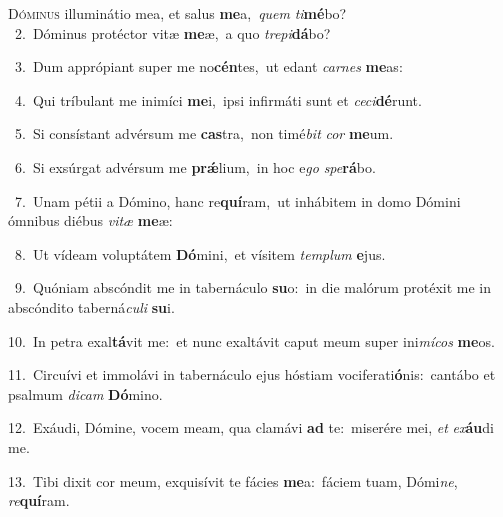\lettrine{\initial\textcolor{\initialcolor}{D}}{óminus} illuminátio mea, et salus \textbf{me}\-a,~\star \textit{quem} \textit{ti}\-\textbf{mé}bo?\\
{\numbfont\textcolor{\numbcolor}{~2.}}~Dóminus protéctor vitæ \textbf{me}\-æ,~\star a quo \textit{tre}\-\textit{pi}\textbf{dá}bo?\par
{\numbfont\textcolor{\numbcolor}{~3.}}~Dum apprópiant super me no\-\textbf{cén}\-tes,~\star ut edant \textit{car}\-\textit{nes} \textbf{me}\-as:\par
{\numbfont\textcolor{\numbcolor}{~4.}}~Qui tríbulant me inimíci \textbf{me}\-i,~\star ipsi infirmáti sunt et \textit{ce}\-\textit{ci}\textbf{dé}runt.\par
{\numbfont\textcolor{\numbcolor}{~5.}}~Si consístant advérsum me \textbf{cas}\-tra,~\star non timé\textit{bit} \textit{cor} \textbf{me}\-um.\par
{\numbfont\textcolor{\numbcolor}{~6.}}~Si exsúrgat advérsum me \textbf{prǽ}\-lium,~\star in hoc e\textit{go} \textit{spe}\-\textbf{rá}bo.\par
{\numbfont\textcolor{\numbcolor}{~7.}}~Unam pétii a Dómino, hanc re\-\textbf{quí}\-ram,~\star ut inhábitem in domo Dómini ómnibus diébus \textit{vi}\-\textit{tæ} \textbf{me}\-æ:\par
{\numbfont\textcolor{\numbcolor}{~8.}}~Ut vídeam voluptátem \textbf{Dó}\-mini,~\star et vísitem \textit{tem}\-\textit{plum} \textbf{e}\-jus.\par
{\numbfont\textcolor{\numbcolor}{~9.}}~Quóniam abscóndit me in tabernáculo \textbf{su}\-o:~\star in die malórum protéxit me in abscóndito taberná\-\textit{cu}\-\textit{li} \textbf{su}\-i.\par
{\numbfont\textcolor{\numbcolor}{10.}}~In petra exal\-\textbf{tá}\-vit me:~\star et nunc exaltávit caput meum super ini\-\textit{mí}\-\textit{cos} \textbf{me}\-os.\par
{\numbfont\textcolor{\numbcolor}{11.}}~Circuívi et immolávi in tabernáculo ejus hóstiam vociferati\-\textbf{ó}\-nis:~\star cantábo et psalmum \textit{di}\-\textit{cam} \textbf{Dó}\-mino.\par
{\numbfont\textcolor{\numbcolor}{12.}}~Exáudi, Dómine, vocem meam, qua clamávi \textbf{ad} te:~\star miserére mei, \textit{et} \textit{ex}\-\textbf{áu}di me.\par
{\numbfont\textcolor{\numbcolor}{13.}}~Tibi dixit cor meum, exquisívit te fácies \textbf{me}\-a:~\star fáciem tuam, Dómi\-\textit{ne}\-, \textit{re}\-\textbf{quí}ram.\par
